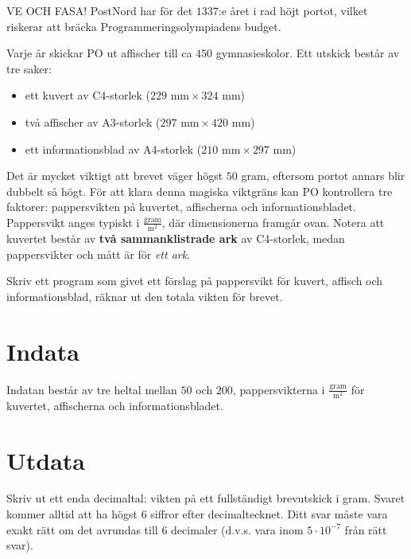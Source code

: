 VE OCH FASA!
PostNord har för det $1337$:e året i rad höjt portot, vilket riskerar att bräcka Programmeringsolympiadens budget.

Varje år skickar PO ut affischer till ca $450$ gymnasieskolor. Ett utskick består av tre saker: 
\begin{itemize}
\item ett kuvert av C4-storlek ($229\text{ mm} \times 324\text{ mm}$)
\item två affischer av A3-storlek ($297\text{ mm} \times 420\text{ mm}$)
\item ett informationsblad av A4-storlek ($210\text{ mm} \times 297\text{ mm}$)
\end{itemize}

Det är mycket viktigt att brevet väger högst $50$ gram, eftersom portot annars blir dubbelt så högt. För att klara denna magiska viktgräns kan PO kontrollera tre faktorer: pappersvikten på kuvertet, affischerna och informationsbladet. Pappersvikt anges typiskt i $\frac{\text{gram}}{\text{m}^2}$, där dimensionerna framgår ovan. Notera att kuvertet består av \textbf{två sammanklistrade ark} av C4-storlek, medan pappersvikter och mått är för \emph{ett ark}.

Skriv ett program som givet ett förslag på pappersvikt för kuvert, affisch och informationsblad, räknar ut den totala vikten för brevet.

\section*{Indata}
Indatan består av tre heltal mellan $50$ och $200$, pappersvikterna i $\frac{\text{gram}}{\text{m}^2}$ för kuvertet, affischerna och informationsbladet.

\section*{Utdata}
Skriv ut ett enda decimaltal: vikten på ett fullständigt brevutskick i gram. 
Svaret kommer alltid att ha högst $6$ siffror efter decimaltecknet.
Ditt svar måste vara exakt rätt om det avrundas till $6$ decimaler (d.v.s. vara inom $5 \cdot 10^{-7}$ från rätt svar).

